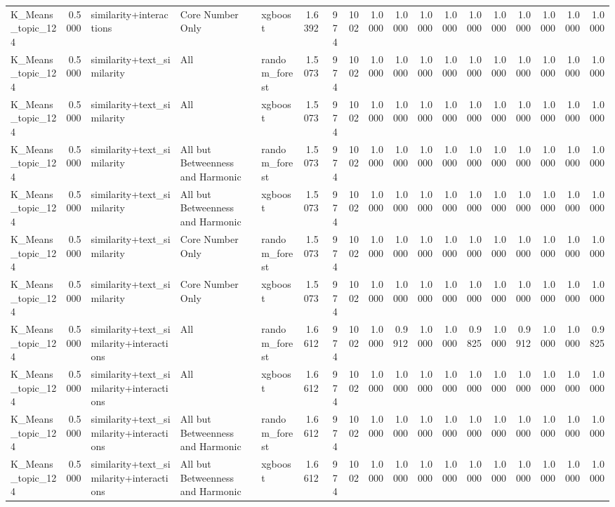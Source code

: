 \begin{tabular}{lrlllrrrrrrrrrrrrr}
K_Means_topic_124 & 0.5000 & similarity+interactions & Core Number Only & xgboost & 1.6392 & 974 & 1002 & 1.0000 & 1.0000 & 1.0000 & 1.0000 & 1.0000 & 1.0000 & 1.0000 & 1.0000 & 1.0000 & 1.0000 \\
K_Means_topic_124 & 0.5000 & similarity+text_similarity & All & random_forest & 1.5073 & 974 & 1002 & 1.0000 & 1.0000 & 1.0000 & 1.0000 & 1.0000 & 1.0000 & 1.0000 & 1.0000 & 1.0000 & 1.0000 \\
K_Means_topic_124 & 0.5000 & similarity+text_similarity & All & xgboost & 1.5073 & 974 & 1002 & 1.0000 & 1.0000 & 1.0000 & 1.0000 & 1.0000 & 1.0000 & 1.0000 & 1.0000 & 1.0000 & 1.0000 \\
K_Means_topic_124 & 0.5000 & similarity+text_similarity & All but Betweenness and Harmonic & random_forest & 1.5073 & 974 & 1002 & 1.0000 & 1.0000 & 1.0000 & 1.0000 & 1.0000 & 1.0000 & 1.0000 & 1.0000 & 1.0000 & 1.0000 \\
K_Means_topic_124 & 0.5000 & similarity+text_similarity & All but Betweenness and Harmonic & xgboost & 1.5073 & 974 & 1002 & 1.0000 & 1.0000 & 1.0000 & 1.0000 & 1.0000 & 1.0000 & 1.0000 & 1.0000 & 1.0000 & 1.0000 \\
K_Means_topic_124 & 0.5000 & similarity+text_similarity & Core Number Only & random_forest & 1.5073 & 974 & 1002 & 1.0000 & 1.0000 & 1.0000 & 1.0000 & 1.0000 & 1.0000 & 1.0000 & 1.0000 & 1.0000 & 1.0000 \\
K_Means_topic_124 & 0.5000 & similarity+text_similarity & Core Number Only & xgboost & 1.5073 & 974 & 1002 & 1.0000 & 1.0000 & 1.0000 & 1.0000 & 1.0000 & 1.0000 & 1.0000 & 1.0000 & 1.0000 & 1.0000 \\
K_Means_topic_124 & 0.5000 & similarity+text_similarity+interactions & All & random_forest & 1.6612 & 974 & 1002 & 1.0000 & 0.9912 & 1.0000 & 1.0000 & 0.9825 & 1.0000 & 0.9912 & 1.0000 & 1.0000 & 0.9825 \\
K_Means_topic_124 & 0.5000 & similarity+text_similarity+interactions & All & xgboost & 1.6612 & 974 & 1002 & 1.0000 & 1.0000 & 1.0000 & 1.0000 & 1.0000 & 1.0000 & 1.0000 & 1.0000 & 1.0000 & 1.0000 \\
K_Means_topic_124 & 0.5000 & similarity+text_similarity+interactions & All but Betweenness and Harmonic & random_forest & 1.6612 & 974 & 1002 & 1.0000 & 1.0000 & 1.0000 & 1.0000 & 1.0000 & 1.0000 & 1.0000 & 1.0000 & 1.0000 & 1.0000 \\
K_Means_topic_124 & 0.5000 & similarity+text_similarity+interactions & All but Betweenness and Harmonic & xgboost & 1.6612 & 974 & 1002 & 1.0000 & 1.0000 & 1.0000 & 1.0000 & 1.0000 & 1.0000 & 1.0000 & 1.0000 & 1.0000 & 1.0000 \\

\end{tabular}
